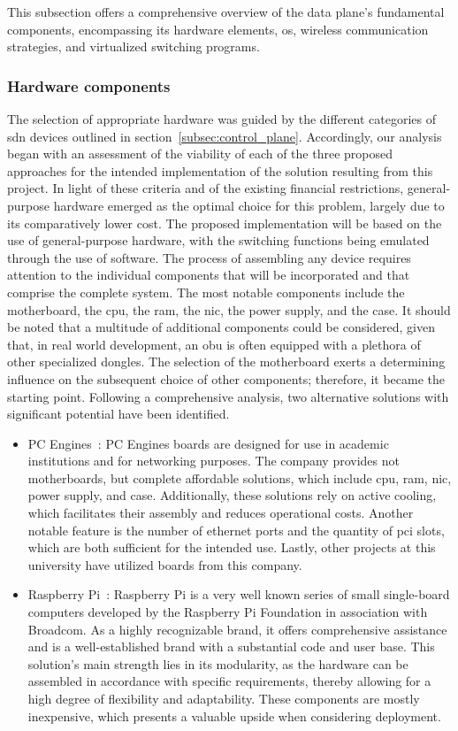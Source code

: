 This subsection offers a comprehensive overview of the data plane's fundamental components, encompassing its hardware elements, \gls{os}, wireless communication strategies, and virtualized switching programs.

\subsubsection{Hardware components}
The selection of appropriate hardware was guided by the different categories of \gls{sdn} devices outlined in section~\ref{subsec:control_plane}. Accordingly, our analysis began with an assessment of the viability of each of the three proposed approaches for the intended implementation of the solution resulting from this project. In light of these criteria and of the existing financial restrictions, general-purpose hardware emerged as the optimal choice for this problem, largely due to its comparatively lower cost. The proposed implementation will be based on the use of general-purpose hardware, with the switching functions being emulated through the use of software.
The process of assembling any device requires attention to the individual components that will be incorporated and that comprise the complete system. The most notable components include the motherboard, the \gls{cpu}, the \gls{ram}, the \gls{nic}, the power supply, and the case. It should be noted that a multitude of additional components could be considered, given that, in real world development, an \gls{obu} is often equipped with a plethora of other specialized dongles.
The selection of the motherboard exerts a determining influence on the subsequent choice of other components; therefore, it became the starting point. Following a comprehensive analysis, two alternative solutions with significant potential have been identified. 
\begin{itemize}
    \item PC Engines~\cite{noauthor_pc_nodate}: 
    PC Engines boards are designed for use in academic institutions and for networking purposes. The company provides not motherboards, but complete affordable solutions, which include \gls{cpu}, \gls{ram}, \gls{nic}, power supply, and case. Additionally, these solutions rely on active cooling, which facilitates their assembly and reduces operational costs. Another notable feature is the number of ethernet ports and the quantity of \gls{pci} slots, which are both sufficient for the intended use. Lastly, other projects at this university have utilized boards from this company.
    \item Raspberry Pi~\cite{ltd_buy_nodate}: 
    Raspberry Pi is a very well known series of small single-board computers developed by the Raspberry Pi Foundation in association with Broadcom. As a highly recognizable brand, it offers comprehensive assistance and is a well-established brand with a substantial code and user base. This solution's main strength lies in its modularity, as the hardware can be assembled in accordance with specific requirements, thereby allowing for a high degree of flexibility and adaptability. These components are mostly inexpensive, which presents a valuable upside when considering deployment.
\end{itemize}
